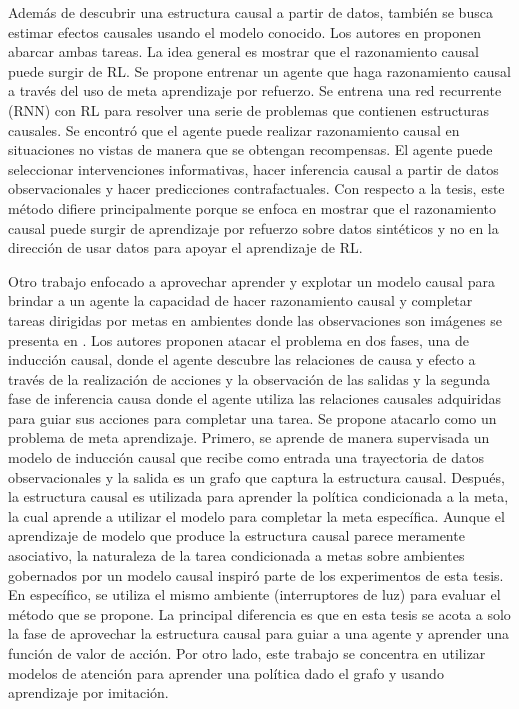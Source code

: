 Además de descubrir una estructura causal a partir de datos, también se busca estimar efectos causales usando el modelo conocido. Los autores en \cite{dasgupta2019causal} proponen abarcar ambas tareas.
La idea general es mostrar que el razonamiento causal puede surgir de RL.
Se propone entrenar un agente que haga razonamiento causal a través del uso de meta
aprendizaje por refuerzo. Se entrena una red recurrente (RNN) con RL para resolver
una serie de problemas que contienen estructuras causales. Se encontró que el agente
puede realizar razonamiento causal en situaciones no vistas de manera que se obtengan
recompensas. El agente puede seleccionar intervenciones informativas, hacer inferencia
causal a partir de datos observacionales y hacer predicciones contrafactuales. Con respecto a la tesis, este método difiere principalmente porque se enfoca en mostrar que el razonamiento causal puede surgir de aprendizaje por refuerzo sobre datos sintéticos y no en la dirección de usar datos para apoyar el aprendizaje de RL.


Otro trabajo enfocado a aprovechar aprender y explotar un modelo causal para brindar a un agente la capacidad de hacer razonamiento causal y completar tareas dirigidas por metas en ambientes donde las observaciones son imágenes se presenta en \cite{nair2019causal}. Los autores proponen atacar el problema en dos fases, una de inducción causal, donde el agente descubre las relaciones de causa y efecto a través de la realización de acciones y la observación de las salidas y la segunda fase de inferencia causa donde el agente utiliza las relaciones causales adquiridas para guiar sus acciones para completar una tarea. Se propone atacarlo como un problema de meta aprendizaje. Primero, se aprende de manera supervisada un modelo de inducción causal que recibe como entrada una trayectoria de datos observacionales y la salida es un grafo que captura la estructura causal. Después, la estructura causal es utilizada para aprender la política condicionada a la meta, la cual aprende a utilizar el modelo para completar la meta específica.	Aunque el aprendizaje de modelo que produce la estructura causal parece meramente asociativo, la naturaleza de la tarea condicionada a metas sobre ambientes gobernados por un modelo causal inspiró parte de los experimentos de esta tesis. En específico, se utiliza el mismo ambiente (interruptores de luz) para evaluar el método que se propone. La principal diferencia es que en esta tesis se acota a solo la fase de aprovechar la estructura causal para guiar a una agente y aprender una función de valor de acción. Por otro lado, este trabajo se concentra en utilizar modelos de atención para aprender una política dado el grafo y usando aprendizaje por imitación.


